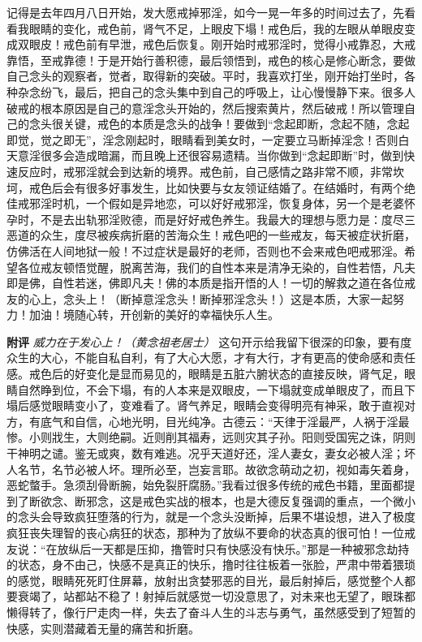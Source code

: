 \begin{case}
    记得是去年四月八日开始，发大愿戒掉邪淫，如今一晃一年多的时间过去了，先看看我眼睛的变化，戒色前，肾气不足，上眼皮下塌！戒色后，我的左眼从单眼皮变成双眼皮！戒色前有早泄，戒色后恢复。刚开始时戒邪淫时，觉得小戒靠忍，大戒靠悟，至戒靠德！于是开始行善积德，最后领悟到，戒色的核心是修心断念，要做自己念头的观察者，觉者，取得新的突破。平时，我喜欢打坐，刚开始打坐时，各种杂念纷飞，最后，把自己的念头集中到自己的呼吸上，让心慢慢静下来。很多人破戒的根本原因是自己的意淫念头开始的，然后搜索黄片，然后破戒！所以管理自己的念头很关键，戒色的本质是念头的战争！要做到“念起即断，念起不随，念起即觉，觉之即无”，淫念刚起时，眼睛看到美女时，一定要立马断掉淫念！否则白天意淫很多会造成暗漏，而且晚上还很容易遗精。当你做到“念起即断”时，做到快速反应时，戒邪淫就会到达新的境界。戒色前，自己感情之路非常不顺，非常坎坷，戒色后会有很多好事发生，比如快要与女友领证结婚了。在结婚时，有两个绝佳戒邪淫时机，一个假如是异地恋，可以好好戒邪淫，恢复身体，另一个是老婆怀孕时，不是去出轨邪淫败德，而是好好戒色养生。我最大的理想与愿力是：度尽三恶道的众生，度尽被疾病折磨的苦海众生！戒色吧的一些戒友，每天被症状折磨，仿佛活在人间地狱一般！不过症状是最好的老师，否则也不会来戒色吧戒邪淫。希望各位戒友顿悟觉醒，脱离苦海，我们的自性本来是清净无染的，自性若悟，凡夫即是佛，自性若迷，佛即凡夫！佛的本质是指开悟的人！一切的解救之道在各位戒友的心上，念头上！（断掉意淫念头！断掉邪淫念头！）这是本质，大家一起努力！加油！境随心转，开创新的美好的幸福快乐人生。

    \textbf{附评} \textit{威力在于发心上！（黄念祖老居士）} 这句开示给我留下很深的印象，要有度众生的大心，不能自私自利，有了大心大愿，才有大行，才有更高的使命感和责任感。戒色后的好变化是显而易见的，眼睛是五脏六腑状态的直接反映，肾气足，眼睛自然睁到位，不会下塌，有的人本来是双眼皮，一下塌就变成单眼皮了，而且下塌后感觉眼睛变小了，变难看了。肾气养足，眼睛会变得明亮有神采，敢于直视对方，有底气和自信，心地光明，目光纯净。古德云：“天律于淫最严，人祸于淫最惨。小则戕生，大则绝嗣。近则削其福寿，远则灾其子孙。阳则受国宪之诛，阴则干神明之谴。鉴无或爽，数有难逃。况乎天道好还，淫人妻女，妻女必被人淫；坏人名节，名节必被人坏。理所必至，岂妄言耶。故欲念萌动之初，视如毒矢着身，恶蛇螫手。急须刮骨断腕，始免裂肝腐肠。”我看过很多传统的戒色书籍，里面都提到了断欲念、断邪念，这是戒色实战的根本，也是大德反复强调的重点，一个微小的念头会导致疯狂堕落的行为，就是一个念头没断掉，后果不堪设想，进入了极度疯狂丧失理智的丧心病狂的状态，那种为了放纵不要命的状态真的很可怕！一位戒友说：“在放纵后一天都是压抑，撸管时只有快感没有快乐。”那是一种被邪念劫持的状态，身不由己，快感不是真正的快乐，撸时往往板着一张脸，严肃中带着猥琐的感觉，眼睛死死盯住屏幕，放射出贪婪邪恶的目光，最后射掉后，感觉整个人都要衰竭了，站都站不稳了！射掉后就感觉一切没意思了，对未来也无望了，眼珠都懒得转了，像行尸走肉一样，失去了奋斗人生的斗志与勇气，虽然感受到了短暂的快感，实则潜藏着无量的痛苦和折磨。


\end{case}

